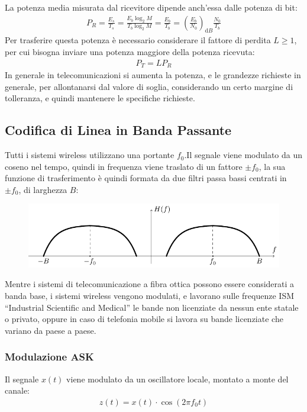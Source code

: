 \documentclass{article}
\newcommand{\df}{\mathrm{d}}
\numberwithin{equation}{subsection}
\begin{document}
La potenza media misurata dal ricevitore dipende anch'essa dalle potenza di bit:
\begin{gather*}
    P_R=\displaystyle\frac{E_s}{T_s}=\frac{E_b\log_2M}{T_b\log_2M}=\frac{E_b}{T_b}=\left(\frac{E_b}{N_0}\right)_{\df B}\frac{N_0}{T_b}
\end{gather*}
Per trasferire questa potenza è necessario considerare il fattore di perdita $L\geq 1$, per cui bisogna inviare una potenza maggiore della potenza ricevuta:
\begin{gather*}
    P_T=LP_R
\end{gather*}
In generale in telecomunicazioni si aumenta la potenza, e le grandezze richieste in generale, per allontanarsi dal valore di soglia, considerando un certo margine di 
tolleranza, e quindi mantenere le specifiche richieste. 

\subsection{Codifica di Linea in Banda Passante}

Tutti i sistemi wireless utilizzano una portante $f_0$.Il segnale viene modulato da un coseno nel tempo, quindi in frequenza viene 
traslato di un fattore $\pm f_0$, la sua funzione di trasferimento è quindi formata da due filtri passa bassi centrati in $\pm f_0$, di larghezza $B$:
\begin{figure}[H]%
    \centering
    \includegraphics{portante.pdf}%
\end{figure}
Mentre i sistemi di telecomunicazione a fibra ottica possono essere considerati a banda base, i sistemi wireless vengono modulati, e lavorano sulle frequenze ISM ``Industrial Scientific and Medical'' 
le bande non licenziate da nessun ente statale o privato, oppure in caso di telefonia mobile si lavora su bande licenziate che variano da paese a paese. 

\subsubsection{Modulazione ASK}

Il segnale $x(t)$ viene modulato da un oscillatore locale, montato a monte del canale:
\begin{gather*}
    z(t)=x(t)\cdot\cos(2\pi f_0t)
\end{gather*}
\end{document}
